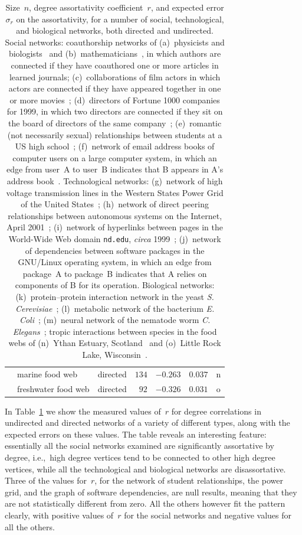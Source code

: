 \documentclass[twocolumn,pre]{revtex4}
\begin{document}
\begin{table}[t]
{\begin{tabular}{rl|c|r|c|l|c}
& marine food web            & directed   & $134$         & $-0.263$          & $0.037$          & n    \\
& freshwater food web        & directed   & $92$          & $-0.326$          & $0.031$          & o    \\
\end{tabular}\hfil}
\caption{Size~$n$, degree assortativity coefficient~$r$, and expected error
$\sigma_r$ on the assortativity, for a number of social, technological, and
biological networks, both directed and undirected.  Social networks:
coauthorship networks of (a)~physicists and biologists~\cite{Newman01a} and
(b)~mathematicians~\cite{GI95}, in which authors are connected if they have
coauthored one or more articles in learned journals; (c)~collaborations of
film actors in which actors are connected if they have appeared together in
one or more movies~\cite{WS98,ASBS00}; (d)~directors of Fortune 1000
companies for 1999, in which two directors are connected if they sit on the
board of directors of the same company~\cite{DYB01}; (e)~romantic (not
necessarily sexual) relationships between students at a US high
school~\cite{BMS02}; (f)~network of email address books of computer users
on a large computer system, in which an edge from user~A to user~B
indicates that B appears in A's address book~\cite{NFB02}.  Technological
networks: (g)~network of high voltage transmission lines in the Western
States Power Grid of the United States~\cite{WS98}; (h)~network of direct
peering relationships between autonomous systems on the Internet, April
2001~\cite{Chen02}; (i)~network of hyperlinks between pages in the
World-Wide Web domain \texttt{nd.edu}, \textit{circa} 1999~\cite{AJB99};
(j)~network of dependencies between software packages in the GNU/Linux
operating system, in which an edge from package~A to package~B indicates
that A relies on components of B for its operation.  Biological networks:
(k)~protein--protein interaction network in the yeast
\textit{S. Cerevisiae}~\cite{Jeong01}; (l)~metabolic network of the
bacterium \textit{E. Coli}~\cite{Jeong00}; (m)~neural network of the
nematode worm \textit{C. Elegans}~\cite{WSTB86,WS98}; tropic interactions
between species in the food webs of (n)~Ythan Estuary,
Scotland~\cite{HBR96} and (o)~Little Rock Lake,
Wisconsin~\cite{Martinez91}.}
\label{dctab}
\end{table}

In Table~\ref{dctab} we show the measured values of~$r$ for degree
correlations in undirected and directed networks of a variety of different
types, along with the expected errors on these values.  The table reveals
an interesting feature: essentially all the social networks examined are
significantly assortative by degree, i.e.,~high degree vertices tend to be
connected to other high degree vertices, while all the technological and
biological networks are disassortative.  Three of the values for~$r$, for
the network of student relationships, the power grid, and the graph of
software dependencies, are null results, meaning that they are not
statistically different from zero.  All the others however fit the pattern
clearly, with positive values of~$r$ for the social networks and negative
values for all the others.
\end{document}
